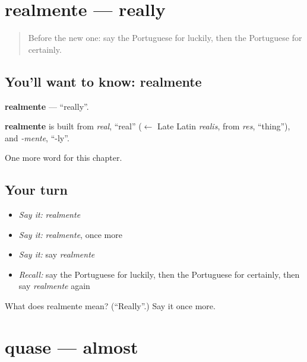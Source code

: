 \section[realmente]{realmente — really}

\label{lesson:PT-C184-realmente}



\begin{quote}
Before the new one: say the Portuguese for luckily, then the Portuguese for certainly.
\end{quote}

\subsection*{You'll want to know: realmente}
\textbf{realmente} — \textquotedblleft{}really\textquotedblright{}.

\begin{cousinweb}
\textbf{realmente} is built from \emph{real}, \textquotedblleft{}real\textquotedblright{} ($\leftarrow$ Late Latin \emph{realis}, from \emph{res}, \textquotedblleft{}thing\textquotedblright{}), and \emph{-mente}, \textquotedblleft{}-ly\textquotedblright{}.
\end{cousinweb}

\begin{grammarlens}[title={What you've built}]
One more word for this chapter.
\end{grammarlens}

\subsection*{Your turn}
\begin{itemize}
\raggedright
  \item \emph{Say it:} \emph{realmente}
  \item \emph{Say it:} \emph{realmente}, once more
  \item \emph{Say it:} say \emph{realmente}
  \item \emph{Recall:} say the Portuguese for luckily, then the Portuguese for certainly, then say \emph{realmente} again
\end{itemize}

\begin{tcolorbox}[breakable,colback=teal!4,colframe=teal!35!black,title={Before you move on}]
What does realmente mean? (\textquotedblleft{}Really\textquotedblright{}.) Say it once more.
\end{tcolorbox}
\section[quase]{quase — almost}

